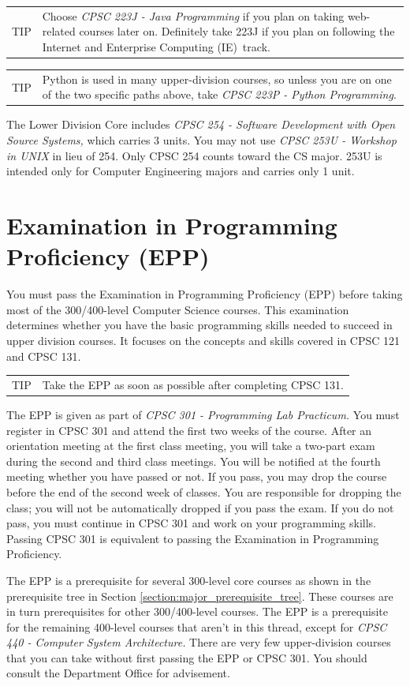 \documentclass{book}
\newenvironment{tip}{
  \tcolorbox \begin{tabular}{m{.5in} m{5in}} \Large{TIP} &
}{
  \end{tabular} \endtcolorbox
}
\newcommand{\IeTrackName}{Internet and Enterprise Computing (IE)}
\begin{document}
\begin{tip}
Choose \emph{CPSC 223J - Java Programming} if you plan on taking web-related courses later on. Definitely take 223J if you plan on following the \IeTrackName~track\IeTrackIndex.
\end{tip}

\begin{tip}
  Python is used in many upper-division courses, so unless you are on one of the two specific paths above, take \emph{CPSC 223P - Python Programming}.
\end{tip}

The Lower Division Core includes \emph{CPSC 254 - Software Development with Open Source Systems,} which carries 3 units. You may not use \emph{CPSC 253U - Workshop in UNIX} in lieu of 254. Only CPSC 254 counts toward the CS major. 253U is intended only for Computer Engineering majors and carries only 1 unit.

\section{Examination in Programming Proficiency (EPP)}
You must pass the Examination in Programming Proficiency (EPP) before taking most of the 300/400-level Computer Science courses. This examination determines whether you have the basic programming skills needed to succeed in upper division courses. It focuses on the concepts and skills covered in CPSC 121 and CPSC 131.

\begin{tip}
  Take the EPP as soon as possible after completing CPSC 131.
  \end{tip}

The EPP is given as part of \emph{CPSC 301 - Programming Lab Practicum.} You must register in CPSC 301 and attend the first two weeks of the course. After an orientation meeting at the first class meeting, you will take a two-part exam during the second and third class meetings. You will be notified at the fourth meeting whether you have passed or not. If you pass, you may drop the course before the end of the second week of classes. You are responsible for dropping the class; you will not be automatically dropped if you pass the exam. If you do not pass, you must continue in CPSC 301 and work on your programming skills. Passing CPSC 301 is equivalent to passing the Examination in Programming Proficiency.

The EPP is a prerequisite for several 300-level core courses as shown in the prerequisite tree in Section \ref{section:major_prerequisite_tree}. These courses are in turn prerequisites for other 300/400-level courses. The EPP is a prerequisite for the remaining 400-level courses that aren’t in this thread, except for \emph{CPSC 440 - Computer System Architecture.} There are very few upper-division courses that you can take without first passing the EPP or CPSC 301. You should consult the Department Office for advisement.
\end{document}

